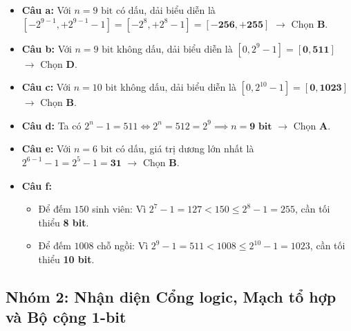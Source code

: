 \begin{itemize}
    \item \textbf{Câu a:} Với $n = 9\text{ bit}$ có dấu, dải biểu diễn là $[-2^{9-1}, +2^{9-1}-1] = [-2^8, +2^8-1] = [\mathbf{-256, +255}]$ $\rightarrow$ Chọn \textbf{B}.
    \item \textbf{Câu b:} Với $n = 9\text{ bit}$ không dấu, dải biểu diễn là $[0, 2^9 - 1] = [\mathbf{0, 511}]$ $\rightarrow$ Chọn \textbf{D}.
    \item \textbf{Câu c:} Với $n = 10\text{ bit}$ không dấu, dải biểu diễn là $[0, 2^{10} - 1] = [\mathbf{0, 1023}]$ $\rightarrow$ Chọn \textbf{B}.
    \item \textbf{Câu d:} Ta có $2^n - 1 = 511 \iff 2^n = 512 = 2^9 \implies n = \mathbf{9\text{ bit}}$ $\rightarrow$ Chọn \textbf{A}.
    \item \textbf{Câu e:} Với $n = 6\text{ bit}$ có dấu, giá trị dương lớn nhất là $2^{6-1} - 1 = 2^5 - 1 = \mathbf{31}$ $\rightarrow$ Chọn \textbf{B}.
    \item \textbf{Câu f:}
    \begin{itemize}
        \item Để đếm $150$ sinh viên: Vì $2^7 - 1 = 127 < 150 \le 2^8 - 1 = 255$, cần tối thiểu \textbf{8 bit}.
        \item Để đếm $1008$ chỗ ngồi: Vì $2^9 - 1 = 511 < 1008 \le 2^{10} - 1 = 1023$, cần tối thiểu \textbf{10 bit}.
    \end{itemize}
\end{itemize}

\subsection{Nhóm 2: Nhận diện Cổng logic, Mạch tổ hợp và Bộ cộng 1-bit}

